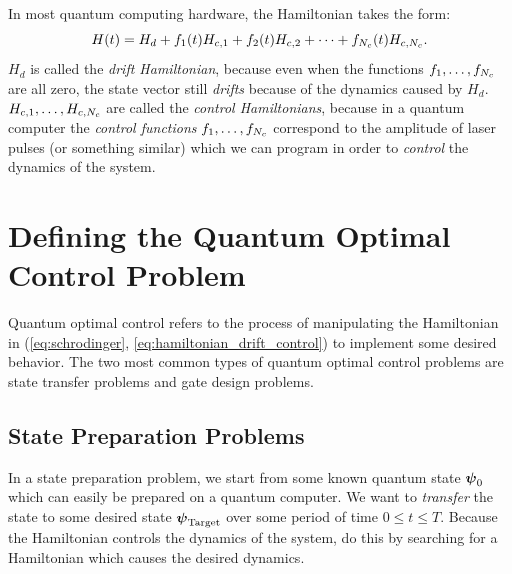 \documentclass[letterpaper]{tufte-handout}
\begin{document}
In most quantum computing hardware, the Hamiltonian takes the form:
\begin{equation} \label{eq:hamiltonian_drift_control}
    H(t) = H_d + f_1(t)H_{c,1} + f_2(t)H_{c,2} + \dots + f_{N_c}(t)H_{c,{N_c}}.
\end{equation}
$H_d$ is called the \emph{drift Hamiltonian}, because even when the functions $f_1,\dots,f_{N_c}$ are all zero, the state vector still \emph{drifts} because of the dynamics caused by $H_d$. $H_{c,1},\dots,H_{c,{N_c}}$ are called the \emph{control Hamiltonians}, because in a quantum computer the \emph{control functions} $f_1,\dots,f_{N_c}$ correspond to the amplitude of laser pulses (or something similar) which we can program in order to \emph{control} the dynamics of the system.

\section{Defining the Quantum Optimal Control Problem}
Quantum optimal control refers to the process of manipulating the Hamiltonian in (\ref{eq:schrodinger}, \ref{eq:hamiltonian_drift_control}) to implement some desired behavior. The two most common types of quantum optimal control problems are state transfer problems and gate design problems.

\subsection{State Preparation Problems}
In a state preparation problem, we start from some known quantum state $\boldsymbol{\psi}_0$ which can easily be prepared on a quantum computer. We want to \emph{transfer} the state to some desired state $\boldsymbol{\psi}_{\textrm{Target}}$ over some period of time $0 \leq t \leq T$. Because the Hamiltonian controls the dynamics of the system, do this by searching for a Hamiltonian which causes the desired dynamics.
\end{document}
